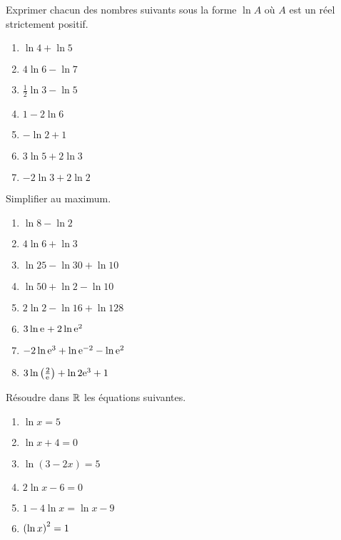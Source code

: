    \begin{exercice}

Exprimer  chacun des nombres suivants sous la forme $ \ln A $ où $ A $ est un réel strictement positif.

\begin{enumerate}
\item $ \ln 4+\ln 5 $
\item $4\ln 6-\ln 7 $ 
\item $ \frac{1}{2}\ln 3-\ln 5 $
\item  $ 1-2\ln 6 $                                               
\item $ -\ln2 +1  $
\item $ 3\ln 5 +2\ln 3$
\item $ -2\ln 3 +2\ln 2$
\end{enumerate}

  \end{exercice}
  
   \begin{exercice}

Simplifier au maximum.

\begin{enumerate}
\item $ \ln 8-\ln 2 $
\item $4\ln 6+\ln 3 $ 
\item $\ln 25 - \ln 30 + \ln 10 $
\item  $ \ln 50 + \ln 2 - \ln 10 $                                               
\item $ 2 \ln 2 - \ln 16 + \ln 128  $
\item $ 3\ln \mathrm{e}^{} +2\ln \mathrm{e}^{2}$
\item $ -2\ln \mathrm{e}^{3} +\ln \mathrm{e}^{-2}-\ln \mathrm{e}^{2}$
\item $ 3\ln \left(\frac{2}{\mathrm{e}^{} }\right) +\ln 2\mathrm{e}^{3} +1$
\end{enumerate}

  \end{exercice}

 
   \begin{exercice}
    Résoudre dans $ \mathbb{R} $  les équations suivantes.
  
\begin{enumerate}
\item $ \ln x=5 $
\item $ \ln x+4=0 $
\item $ \ln (3-2x)=5 $  
\item $ 2\ln x- 6=0$  
\item  $ 1-4\ln x=\ln x -9 $  
\item $ \left(\ln x\right)^{2}=1$  
\end{enumerate}

  \end{exercice}
  
